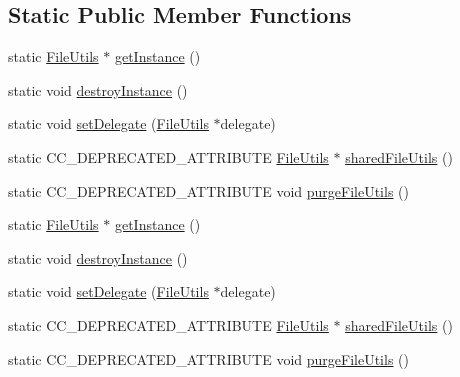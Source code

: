 \subsection*{Static Public Member Functions}
\begin{DoxyCompactItemize}
\item 
static \hyperlink{classFileUtils}{File\+Utils} $\ast$ \hyperlink{classFileUtils_ac8ced4394d59f5459445ced27ccd0e8a}{get\+Instance} ()
\item 
static void \hyperlink{classFileUtils_abc5586f1eccca854b227e3cd8738cefd}{destroy\+Instance} ()
\item 
static void \hyperlink{classFileUtils_a912337c1295de714a304af0f61a0ebe0}{set\+Delegate} (\hyperlink{classFileUtils}{File\+Utils} $\ast$delegate)
\item 
static C\+C\+\_\+\+D\+E\+P\+R\+E\+C\+A\+T\+E\+D\+\_\+\+A\+T\+T\+R\+I\+B\+U\+TE \hyperlink{classFileUtils}{File\+Utils} $\ast$ \hyperlink{classFileUtils_a2ba619bc7a771cead0d5ed2465bcd523}{shared\+File\+Utils} ()
\item 
static C\+C\+\_\+\+D\+E\+P\+R\+E\+C\+A\+T\+E\+D\+\_\+\+A\+T\+T\+R\+I\+B\+U\+TE void \hyperlink{classFileUtils_ac420e697b4b0c1a3c5e9711dcaa66c31}{purge\+File\+Utils} ()
\item 
static \hyperlink{classFileUtils}{File\+Utils} $\ast$ \hyperlink{classFileUtils_a4a0874cba0ed3d182b0b48b926ce529c}{get\+Instance} ()
\item 
static void \hyperlink{classFileUtils_a16799eaacfe932e8025d77c59080a4a2}{destroy\+Instance} ()
\item 
static void \hyperlink{classFileUtils_aa53a6facb5bf6d418d71a9b8503a0756}{set\+Delegate} (\hyperlink{classFileUtils}{File\+Utils} $\ast$delegate)
\item 
static C\+C\+\_\+\+D\+E\+P\+R\+E\+C\+A\+T\+E\+D\+\_\+\+A\+T\+T\+R\+I\+B\+U\+TE \hyperlink{classFileUtils}{File\+Utils} $\ast$ \hyperlink{classFileUtils_a2ba619bc7a771cead0d5ed2465bcd523}{shared\+File\+Utils} ()
\item 
static C\+C\+\_\+\+D\+E\+P\+R\+E\+C\+A\+T\+E\+D\+\_\+\+A\+T\+T\+R\+I\+B\+U\+TE void \hyperlink{classFileUtils_ac420e697b4b0c1a3c5e9711dcaa66c31}{purge\+File\+Utils} ()
\end{DoxyCompactItemize}
